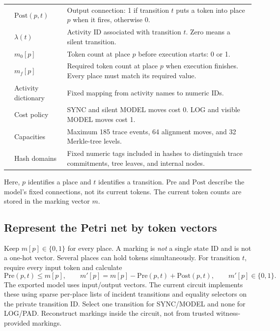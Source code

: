 \documentclass[10pt,a4paper]{article}
\begin{document}
\begin{tabularx}{\textwidth}{
    @{}p{}p{}X@{}
}
& $\mathrm{Post}(p,t)$
& Output connection: 1 if transition $t$ puts a token
into place $p$ when it fires, otherwise 0.\\

& $\lambda(t)$
& Activity ID associated with transition $t$.
Zero means a silent transition.\\

& $m_0[p]$
& Token count at place $p$ before execution starts:
0 or 1.\\

& $m_f[p]$
& Required token count at place $p$ when execution
finishes. Every place must match its required value.\\

& Activity dictionary
& Fixed mapping from activity names to numeric IDs.\\

& Cost policy
& SYNC and silent MODEL moves cost 0.
LOG and visible MODEL moves cost 1.\\

& Capacities
& Maximum 185 trace events, 64 alignment moves,
and 32 Merkle-tree levels.\\

& Hash domains
& Fixed numeric tags included in hashes to distinguish
trace commitments, tree leaves, and internal nodes.\\

\bottomrule
\end{tabularx}

\smallskip
Here, $p$ identifies a place and $t$ identifies a transition.
$\mathrm{Pre}$ and $\mathrm{Post}$ describe the model's fixed
connections, not its current tokens. The current token
counts are stored in the marking vector $m$.

\subsection*{Represent the Petri net by token vectors}
Keep $m[p]\in\{0,1\}$ for every place. A marking is \emph{not} a single state ID and is not a one-hot vector. Several places can hold tokens simultaneously. For transition $t$, require every input token and calculate
\[
\mathrm{Pre}(p,t)\leq m[p],\qquad
m'[p]=m[p]-\mathrm{Pre}(p,t)+\mathrm{Post}(p,t),\qquad m'[p]\in\{0,1\}.
\]
The exported model uses input/output vectors. The current circuit implements these using sparse per-place lists of incident transitions and equality selectors on the private transition ID. Select one transition for SYNC/MODEL and none for LOG/PAD. Reconstruct markings inside the circuit, not from trusted witness-provided markings.
\end{document}
